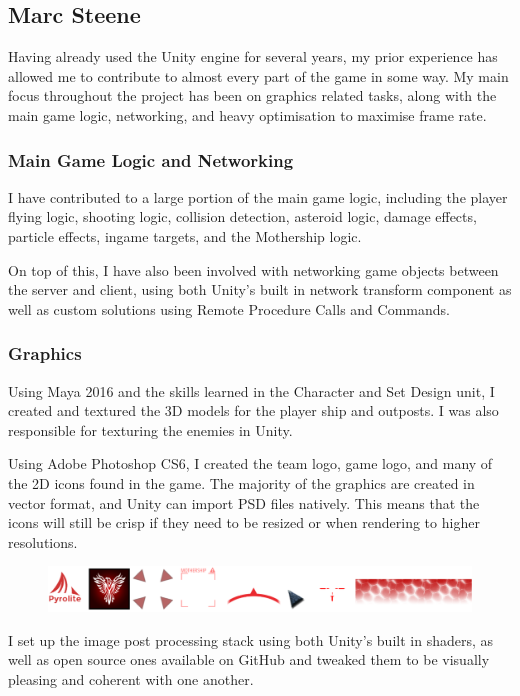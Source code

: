 \documentclass[a4paper,11pt]{article}
\begin{document}
\clearpage

\subsection{Marc Steene}
Having already used the Unity engine for several years, my prior experience has allowed me to contribute to almost every part of the game in some way. My main focus throughout the project has been on graphics related tasks, along with the main game logic, networking, and heavy optimisation to maximise frame rate.

\subsubsection{Main Game Logic and Networking}
I have contributed to a large portion of the main game logic, including the player flying logic, shooting logic, collision detection, asteroid logic, damage effects, particle effects, ingame targets, and the Mothership logic.

On top of this, I have also been involved with networking game objects between the server and client, using both Unity’s built in network transform component as well as custom solutions using Remote Procedure Calls and Commands.

\subsubsection{Graphics}
Using Maya 2016 and the skills learned in the Character and Set Design unit, I created and textured the 3D models for the player ship and outposts. I was also responsible for texturing the enemies in Unity. 

Using Adobe Photoshop CS6, I created the team logo, game logo, and many of the 2D icons found in the game. The majority of the graphics are created in vector format, and Unity can import PSD files natively. This means that the icons will still be crisp if they need to be resized or when rendering to higher resolutions.

\begin{figure}[ht]
	\centering
	\includegraphics[width=\textwidth]{images/2dArt}
\end{figure}

I set up the image post processing stack using both Unity’s built in shaders, as well as open source ones available on GitHub and tweaked them to be visually pleasing and coherent with one another.
\end{document}
